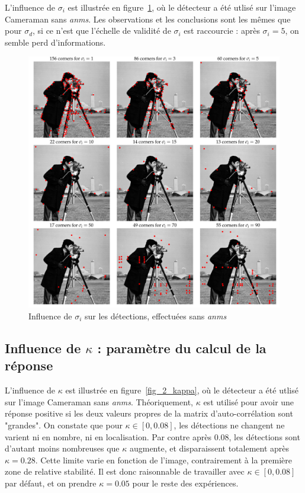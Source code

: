 \documentclass[12pt,a4paper,onecolumn]{article}
\begin{document}
L'influence de \(\sigma_i\) est illustrée en figure~\ref{fig_2_sigma_i}, où le détecteur a été utlisé sur l'image Cameraman sans \textit{anms}. Les observations et les conclusions sont les mêmes que pour \(\sigma_d\), si ce n'est que l'échelle de validité de \(\sigma_i\) est raccourcie : après \(\sigma_i = 5\), on semble perd d'informations.

\begin{figure}[H]
	\centering
	\includegraphics[width = 1.0\textwidth]{2_cameraman_si}
	\caption{Influence de \(\sigma_i\) sur les détections, effectuées sans \textit{anms}}
	\label{fig_2_sigma_i}
\end{figure}

\subsection{Influence de \(\kappa\) : paramètre du calcul de la réponse}

L'influence de \(\kappa\) est illustrée en figure~\ref{fig_2_kappa}, où le détecteur a été utlisé sur l'image Cameraman sans \textit{anms}. Théoriquement, \(\kappa\) est utilisé pour avoir une réponse positive si les deux valeurs propres de la matrix d'auto-corrélation sont "grandes". On constate que pour \(\kappa \in [0, 0.08]\), les détections ne changent ne varient ni en nombre, ni en localisation. Par contre après 0.08, les détections sont d'autant moins nombreuses que \(\kappa\) augmente, et disparaissent totalement après \(\kappa = 0.28\). Cette limite varie en fonction de l'image, contrairement à la première zone de relative stabilité. Il est donc raisonnable de travailler avec \(\kappa \in [0, 0.08]\) par défaut, et on prendre \(\kappa = 0.05 \) pour le reste des expériences.
\end{document}
